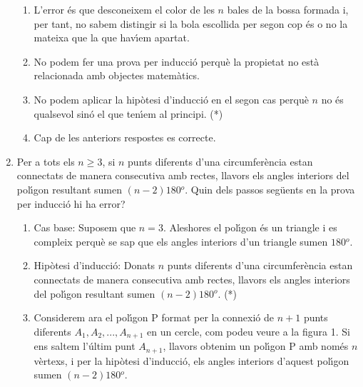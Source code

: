 \begin{enumerate}
\begin{enumerate}
\item L'error \'{e}s que desconeixem el color de les $n$ bales de la bossa
formada i, per tant, no sabem distingir si la bola escollida per segon cop
\'{e}s o no la mateixa que la que hav\'{\i}em apartat.

\item No podem fer una prova per inducci\'{o} perqu\`{e} la propietat no
est\`{a} relacionada amb objectes matem\`{a}tics.

\item No podem aplicar la hip\`{o}tesi d'inducci\'{o} en el segon cas
perqu\`{e} $n$ no \'{e}s qualsevol sin\'{o} el que ten\'{\i}em al principi. (*)

\item Cap de les anteriors respostes es correcte.
\end{enumerate}

\item Per a tots els $n\geq3$, si $n$ punts diferents d'una circumfer\`{e}ncia
estan connectats de manera consecutiva amb rectes, llavors els angles
interiors del pol\'{\i}gon resultant sumen $\left(  n-2\right)  180%
{{}^o}%
$. Quin dels passos seg\"{u}ents en la prova per inducci\'{o} hi ha error?

\begin{enumerate}
\item Cas base: Suposem que $n=3$. Aleshores el pol\'{\i}gon \'{e}s un
triangle i es compleix perqu\`{e} se sap que els angles interiors d'un
triangle sumen $180%
{{}^o}%
$.

\item Hip\`{o}tesi d'inducci\'{o}: Donats $n$ punts diferents d'una
circumfer\`{e}ncia estan connectats de manera consecutiva amb rectes, llavors
els angles interiors del pol\'{\i}gon resultant sumen $\left(  n-2\right)  180%
{{}^o}%
$. (*)

\item Considerem ara el pol\'{\i}gon P format per la connexi\'{o} de $n+1$
punts diferents $A_{1},A_{2},...,A_{n+1}$ en un cercle, com podeu veure a la
figura 1. Si ens saltem l'\'{u}ltim punt $A_{n+1}$, llavors obtenim un
pol\'{\i}gon P amb nom\'{e}s $n$ v\`{e}rtexs, i per la hip\`{o}tesi
d'inducci\'{o}, els angles interiors d'aquest pol\'{\i}gon sumen $\left(
n-2\right)  180%
{{}^o}%
$.%



\end{enumerate}
\end{enumerate}

